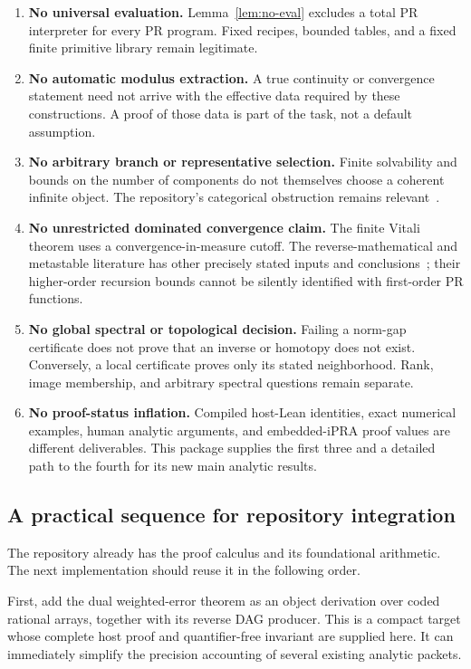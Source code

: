 \begin{enumerate}
\item \textbf{No universal evaluation.} Lemma~\ref{lem:no-eval} excludes a total PR interpreter for every PR program. Fixed recipes, bounded tables, and a fixed finite primitive library remain legitimate.
\item \textbf{No automatic modulus extraction.} A true continuity or convergence statement need not arrive with the effective data required by these constructions. A proof of those data is part of the task, not a default assumption.
\item \textbf{No arbitrary branch or representative selection.} Finite solvability and bounds on the number of components do not themselves choose a coherent infinite object. The repository's categorical obstruction remains relevant~\cite{repo-obstacles}.
\item \textbf{No unrestricted dominated convergence claim.} The finite Vitali theorem uses a convergence-in-measure cutoff. The reverse-mathematical and metastable literature has other precisely stated inputs and conclusions~\cite{measureADR2012,measureADRMeta2012}; their higher-order recursion bounds cannot be silently identified with first-order PR functions.
\item \textbf{No global spectral or topological decision.} Failing a norm-gap certificate does not prove that an inverse or homotopy does not exist. Conversely, a local certificate proves only its stated neighborhood. Rank, image membership, and arbitrary spectral questions remain separate.
\item \textbf{No proof-status inflation.} Compiled host-Lean identities, exact numerical examples, human analytic arguments, and embedded-iPRA proof values are different deliverables. This package supplies the first three and a detailed path to the fourth for its new main analytic results.
\end{enumerate}

\subsection{A practical sequence for repository integration}

The repository already has the proof calculus and its foundational arithmetic. The next implementation should reuse it in the following order.

First, add the dual weighted-error theorem as an object derivation over coded rational arrays, together with its reverse DAG producer. This is a compact target whose complete host proof and quantifier-free invariant are supplied here. It can immediately simplify the precision accounting of several existing analytic packets.

